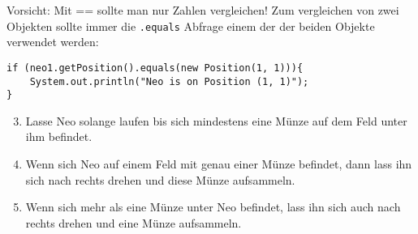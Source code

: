 \begin{Infobox}[\lstinline{==} und \lstinline{.equals()}]
	Vorsicht: Mit == sollte man nur Zahlen vergleichen! 
	Zum vergleichen von zwei Objekten sollte immer die \lstinline{.equals} Abfrage einem der der beiden Objekte verwendet werden:

	\begin{lstlisting}
if (neo1.getPosition().equals(new Position(1, 1))){
	System.out.println("Neo is on Position (1, 1)");
}
	\end{lstlisting}

\end{Infobox}


\begin{enumerate}\setcounter{enumi}{2}
	\item
		Lasse Neo solange laufen bis sich mindestens eine Münze auf dem Feld unter ihm befindet.

	\item
		Wenn sich Neo auf einem Feld mit genau einer Münze befindet, dann lass ihn sich nach rechts drehen und diese Münze aufsammeln.

	\item
		Wenn sich mehr als eine Münze unter Neo befindet, lass ihn sich auch nach rechts drehen und eine Münze aufsammeln.
\end{enumerate}


